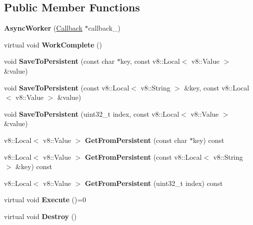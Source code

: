 \subsection*{Public Member Functions}
\begin{DoxyCompactItemize}
\item 
\mbox{\label{class_nan_1_1_async_worker_a20d35fd00d6599645fe788b07aae8eb8}} 
{\bfseries Async\+Worker} (\hyperlink{class_nan_1_1_callback}{Callback} $\ast$callback\+\_\+)
\item 
\mbox{\label{class_nan_1_1_async_worker_a3e3c6ee57e067096db8386325f8a4f48}} 
virtual void {\bfseries Work\+Complete} ()
\item 
\mbox{\label{class_nan_1_1_async_worker_a8aa2cba350525776a66919238f54a721}} 
void {\bfseries Save\+To\+Persistent} (const char $\ast$key, const v8\+::\+Local$<$ v8\+::\+Value $>$ \&value)
\item 
\mbox{\label{class_nan_1_1_async_worker_a36b2e507211efd49813c050567ee308f}} 
void {\bfseries Save\+To\+Persistent} (const v8\+::\+Local$<$ v8\+::\+String $>$ \&key, const v8\+::\+Local$<$ v8\+::\+Value $>$ \&value)
\item 
\mbox{\label{class_nan_1_1_async_worker_a5ba4238ad96004554accf34e28568fbc}} 
void {\bfseries Save\+To\+Persistent} (uint32\+\_\+t index, const v8\+::\+Local$<$ v8\+::\+Value $>$ \&value)
\item 
\mbox{\label{class_nan_1_1_async_worker_a781abb55452a0abb903e7d7fa10eaa87}} 
v8\+::\+Local$<$ v8\+::\+Value $>$ {\bfseries Get\+From\+Persistent} (const char $\ast$key) const
\item 
\mbox{\label{class_nan_1_1_async_worker_a25057f22f6f515b0c5611135d0d3852d}} 
v8\+::\+Local$<$ v8\+::\+Value $>$ {\bfseries Get\+From\+Persistent} (const v8\+::\+Local$<$ v8\+::\+String $>$ \&key) const
\item 
\mbox{\label{class_nan_1_1_async_worker_a8a3dc33e5e7f5542162f80ef4cf320d9}} 
v8\+::\+Local$<$ v8\+::\+Value $>$ {\bfseries Get\+From\+Persistent} (uint32\+\_\+t index) const
\item 
\mbox{\label{class_nan_1_1_async_worker_a0dec1b584bbadd43ac3124b26349135c}} 
virtual void {\bfseries Execute} ()=0
\item 
\mbox{\label{class_nan_1_1_async_worker_a8ebec87c9c7d993b0afc7641fcb40380}} 
virtual void {\bfseries Destroy} ()
\end{DoxyCompactItemize}
